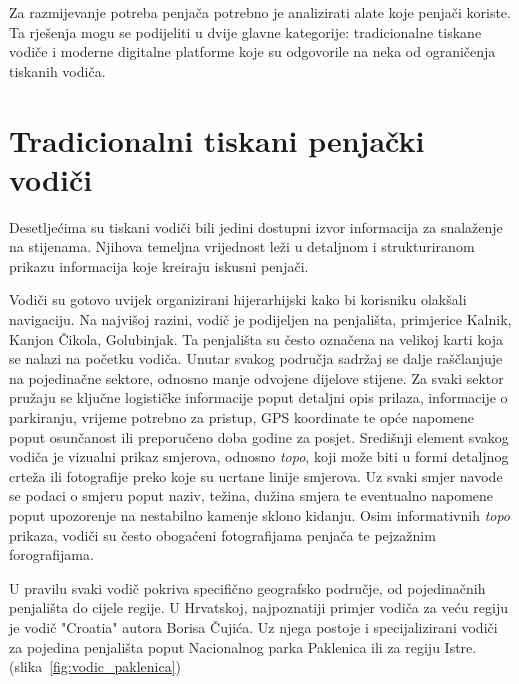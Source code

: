 
Za razmijevanje potreba penjača potrebno je analizirati alate koje penjači koriste. Ta rješenja mogu se podijeliti u dvije glavne kategorije: tradicionalne tiskane vodiče i moderne digitalne platforme koje su odgovorile na neka od ograničenja tiskanih vodiča.

\section{Tradicionalni tiskani penjački vodiči}

Desetljećima su tiskani vodiči bili jedini dostupni izvor informacija za snalaženje na stijenama. Njihova temeljna vrijednost leži u detaljnom i strukturiranom prikazu informacija koje kreiraju iskusni penjači. 

Vodiči su gotovo uvijek organizirani hijerarhijski kako bi korisniku olakšali navigaciju. Na najvišoj razini, vodič je podijeljen na penjališta, primjerice Kalnik, Kanjon Čikola, Golubinjak. Ta penjališta su često označena na velikoj karti koja se nalazi na početku vodiča. Unutar svakog područja sadržaj se dalje raščlanjuje na pojedinačne sektore, odnosno manje odvojene dijelove stijene. Za svaki sektor pružaju se ključne logističke informacije poput detaljni opis prilaza, informacije o parkiranju, vrijeme potrebno za pristup, GPS koordinate te opće napomene poput osunčanost ili preporučeno doba godine za posjet. 
Središnji element svakog vodiča je vizualni prikaz smjerova, odnosno \textit{topo}, koji može biti u formi detaljnog crteža ili fotografije preko koje su ucrtane linije smjerova. Uz svaki smjer navode se podaci o smjeru poput naziv, težina, dužina smjera te eventualno napomene poput upozorenje na nestabilno kamenje sklono kidanju. Osim informativnih \textit{topo} prikaza, vodiči su često obogaćeni fotografijama penjača te pejzažnim forografijama. 


U pravilu svaki vodič pokriva specifično geografsko područje, od pojedinačnih penjališta do cijele regije. U Hrvatskoj, najpoznatiji primjer vodiča za veću regiju je vodič "Croatia" autora Borisa Čujića. Uz njega postoje i specijalizirani vodiči za pojedina penjališta poput Nacionalnog parka Paklenica ili za regiju Istre. (slika~\ref{fig:vodic_paklenica})


